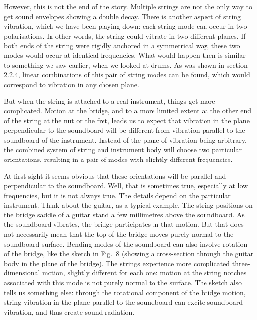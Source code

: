   However, this is not the end of the story. Multiple strings are not the only 
  way to get sound envelopes showing a double decay. There is another aspect of 
  string vibration, which we have been playing down: each string mode can occur 
  in two polarisations. In other words, the string could vibrate in two 
  different planes. If both ends of the string were rigidly anchored in a 
  symmetrical way, these two modes would occur at identical frequencies. What 
  would happen then is similar to something we saw earlier, when we looked at 
  drums. As was shown in section 2.2.4, linear combinations of this pair of 
  string modes can be found, which would correspond to vibration in any chosen 
  plane. 

  But when the string is attached to a real instrument, things get more 
  complicated. Motion at the bridge, and to a more limited extent at the other 
  end of the string at the nut or the fret, leads us to expect that vibration 
  in the plane perpendicular to the soundboard will be different from vibration 
  parallel to the soundboard of the instrument. Instead of the plane of 
  vibration being arbitrary, the combined system of string and instrument body 
  will choose two particular orientations, resulting in a pair of modes with 
  slightly different frequencies. 

  At first sight it seems obvious that these orientations will be parallel and 
  perpendicular to the soundboard. Well, that is sometimes true, especially at 
  low frequencies, but it is not always true. The details depend on the 
  particular instrument. Think about the guitar, as a typical example. The 
  string positions on the bridge saddle of a guitar stand a few millimetres 
  above the soundboard. As the soundboard vibrates, the bridge participates in 
  that motion. But that does not necessarily mean that the top of the bridge 
  moves purely normal to the soundboard surface. Bending modes of the 
  soundboard can also involve rotation of the bridge, like the sketch in Fig.\ 
  8 (showing a cross-section through the guitar body in the plane of the 
  bridge). The strings experience more complicated three-dimensional motion, 
  slightly different for each one: motion at the string notches associated with 
  this mode is not purely normal to the surface. The sketch also tells us 
  something else: through the rotational component of the bridge motion, string 
  vibration in the plane parallel to the soundboard can excite soundboard 
  vibration, and thus create sound radiation. 

